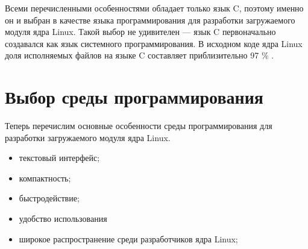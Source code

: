 Всеми перечисленными особенностями обладает только язык C, поэтому именно он и выбран в качестве языка программирования для разработки загружаемого модуля ядра Linux.
Такой выбор не удивителен — язык C первоначально создавался как язык системного программирования.
В исходном коде ядра Linux доля исполняемых файлов на языке C составляет приблизительно 97 \% \cite{github-linux}.


\section{Выбор среды программирования}

Теперь перечислим основные особенности среды программирования для разработки загружаемого модуля ядра Linux.
\begin{itemize}
	\item текстовый интерфейс;
	\item компактность;
	\item быстродействие;
	\item удобство использования
	\item широкое распространение среди разработчиков ядра Linux;
\end{itemize}

